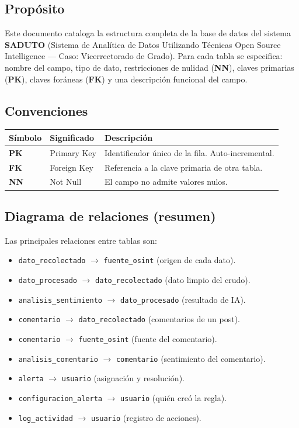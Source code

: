 \documentclass[11pt,a4paper]{article}
\newcommand{\pk}{\textcolor{emiblue}{\textbf{PK}}}
\newcommand{\fk}{\textcolor{orange!80!black}{\textbf{FK}}}
\newcommand{\nn}{\textcolor{red!70!black}{\textbf{NN}}}
\begin{document}
\subsection{Propósito}
Este documento cataloga la estructura completa de la base de datos del sistema \textbf{SADUTO} (Sistema de Analítica de Datos Utilizando Técnicas Open Source Intelligence — Caso: Vicerrectorado de Grado). Para cada tabla se especifica: nombre del campo, tipo de dato, restricciones de nulidad (\nn), claves primarias (\pk), claves foráneas (\fk) y una descripción funcional del campo.

\subsection{Convenciones}
\begin{table}[H]
\centering
\begin{tabularx}{\textwidth}{l l X}
\toprule
\textbf{Símbolo} & \textbf{Significado} & \textbf{Descripción} \\
\midrule
\pk & Primary Key & Identificador único de la fila. Auto-incremental. \\
\fk & Foreign Key & Referencia a la clave primaria de otra tabla. \\
\nn & Not Null & El campo no admite valores nulos. \\
\bottomrule
\end{tabularx}
\end{table}

\subsection{Diagrama de relaciones (resumen)}
Las principales relaciones entre tablas son:

\begin{itemize}
  \item \texttt{dato\_recolectado} $\rightarrow$ \texttt{fuente\_osint} (origen de cada dato).
  \item \texttt{dato\_procesado} $\rightarrow$ \texttt{dato\_recolectado} (dato limpio del crudo).
  \item \texttt{analisis\_sentimiento} $\rightarrow$ \texttt{dato\_procesado} (resultado de IA).
  \item \texttt{comentario} $\rightarrow$ \texttt{dato\_recolectado} (comentarios de un post).
  \item \texttt{comentario} $\rightarrow$ \texttt{fuente\_osint} (fuente del comentario).
  \item \texttt{analisis\_comentario} $\rightarrow$ \texttt{comentario} (sentimiento del comentario).
  \item \texttt{alerta} $\rightarrow$ \texttt{usuario} (asignación y resolución).
  \item \texttt{configuracion\_alerta} $\rightarrow$ \texttt{usuario} (quién creó la regla).
  \item \texttt{log\_actividad} $\rightarrow$ \texttt{usuario} (registro de acciones).
\end{itemize}
\end{document}

